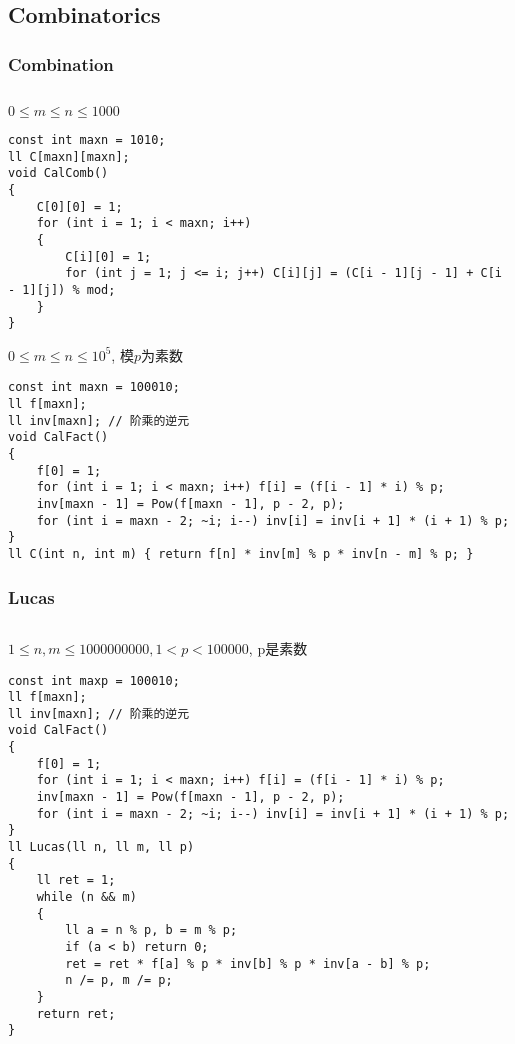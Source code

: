 \documentclass[twoside]{article}
\begin{document}
\subsection{Combinatorics}
\subsubsection{Combination}
\begin{lstlisting}
\end{lstlisting}
$0 \leq m \leq n \leq 1000$
\begin{lstlisting}
const int maxn = 1010;
ll C[maxn][maxn];
void CalComb()
{
    C[0][0] = 1;
    for (int i = 1; i < maxn; i++)
    {
        C[i][0] = 1;
        for (int j = 1; j <= i; j++) C[i][j] = (C[i - 1][j - 1] + C[i - 1][j]) % mod;
    }
}

\end{lstlisting}
$0 \leq m \leq n \leq 10^5$, 模$p$为素数
\begin{lstlisting}
const int maxn = 100010;
ll f[maxn];
ll inv[maxn]; // 阶乘的逆元
void CalFact()
{
    f[0] = 1;
    for (int i = 1; i < maxn; i++) f[i] = (f[i - 1] * i) % p;
    inv[maxn - 1] = Pow(f[maxn - 1], p - 2, p);
    for (int i = maxn - 2; ~i; i--) inv[i] = inv[i + 1] * (i + 1) % p;
}
ll C(int n, int m) { return f[n] * inv[m] % p * inv[n - m] % p; }
\end{lstlisting}
\subsubsection{Lucas}
\begin{lstlisting}
\end{lstlisting}
$1 \leq n, m \leq 1000000000, 1 < p < 100000$, p是素数
\begin{lstlisting}
const int maxp = 100010;
ll f[maxn];
ll inv[maxn]; // 阶乘的逆元
void CalFact()
{
    f[0] = 1;
    for (int i = 1; i < maxn; i++) f[i] = (f[i - 1] * i) % p;
    inv[maxn - 1] = Pow(f[maxn - 1], p - 2, p);
    for (int i = maxn - 2; ~i; i--) inv[i] = inv[i + 1] * (i + 1) % p;
}
ll Lucas(ll n, ll m, ll p)
{
    ll ret = 1;
    while (n && m)
    {
        ll a = n % p, b = m % p;
        if (a < b) return 0;
        ret = ret * f[a] % p * inv[b] % p * inv[a - b] % p;
        n /= p, m /= p;
    }
    return ret;
}
\end{lstlisting}
\end{document}
